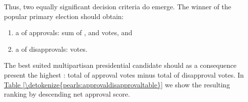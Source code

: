 \documentclass[a4paper,12pt,english]{sphinxhowto}
\begin{document}
\sphinxAtStartPar
Thus, two equally significant decision criteria do emerge. The winner of the popular primary election should obtain:
\begin{enumerate}
%
\item {} 
\sphinxAtStartPar
a  of approvals: sum of ,  and  votes, and

\item {} 
\sphinxAtStartPar
a  of disapprovals:  votes.

\end{enumerate}

\sphinxAtStartPar
The best suited multipartisan presidential candidate should as a consequence present the highest : total of approval votes minus total of disapproval votes. In \hyperref[\detokenize{pearls:approvaldisapprovaltable}]{Table \ref{\detokenize{pearls:approvaldisapprovaltable}}} we show the resulting ranking by descending net approval score.
\end{document}
